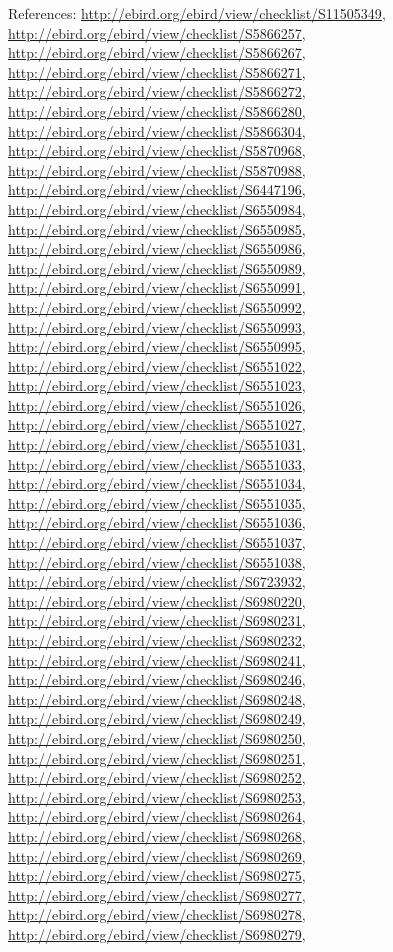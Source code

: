 \documentclass[9pt, article]{memoir}
\begin{document}
\begin{multicols}{2}
References: 
\url{http://ebird.org/ebird/view/checklist/S11505349}, 
\url{http://ebird.org/ebird/view/checklist/S5866257}, 
\url{http://ebird.org/ebird/view/checklist/S5866267}, 
\url{http://ebird.org/ebird/view/checklist/S5866271}, 
\url{http://ebird.org/ebird/view/checklist/S5866272}, 
\url{http://ebird.org/ebird/view/checklist/S5866280}, 
\url{http://ebird.org/ebird/view/checklist/S5866304}, 
\url{http://ebird.org/ebird/view/checklist/S5870968}, 
\url{http://ebird.org/ebird/view/checklist/S5870988}, 
\url{http://ebird.org/ebird/view/checklist/S6447196}, 
\url{http://ebird.org/ebird/view/checklist/S6550984}, 
\url{http://ebird.org/ebird/view/checklist/S6550985}, 
\url{http://ebird.org/ebird/view/checklist/S6550986}, 
\url{http://ebird.org/ebird/view/checklist/S6550989}, 
\url{http://ebird.org/ebird/view/checklist/S6550991}, 
\url{http://ebird.org/ebird/view/checklist/S6550992}, 
\url{http://ebird.org/ebird/view/checklist/S6550993}, 
\url{http://ebird.org/ebird/view/checklist/S6550995}, 
\url{http://ebird.org/ebird/view/checklist/S6551022}, 
\url{http://ebird.org/ebird/view/checklist/S6551023}, 
\url{http://ebird.org/ebird/view/checklist/S6551026}, 
\url{http://ebird.org/ebird/view/checklist/S6551027}, 
\url{http://ebird.org/ebird/view/checklist/S6551031}, 
\url{http://ebird.org/ebird/view/checklist/S6551033}, 
\url{http://ebird.org/ebird/view/checklist/S6551034}, 
\url{http://ebird.org/ebird/view/checklist/S6551035}, 
\url{http://ebird.org/ebird/view/checklist/S6551036}, 
\url{http://ebird.org/ebird/view/checklist/S6551037}, 
\url{http://ebird.org/ebird/view/checklist/S6551038}, 
\url{http://ebird.org/ebird/view/checklist/S6723932}, 
\url{http://ebird.org/ebird/view/checklist/S6980220}, 
\url{http://ebird.org/ebird/view/checklist/S6980231}, 
\url{http://ebird.org/ebird/view/checklist/S6980232}, 
\url{http://ebird.org/ebird/view/checklist/S6980241}, 
\url{http://ebird.org/ebird/view/checklist/S6980246}, 
\url{http://ebird.org/ebird/view/checklist/S6980248}, 
\url{http://ebird.org/ebird/view/checklist/S6980249}, 
\url{http://ebird.org/ebird/view/checklist/S6980250}, 
\url{http://ebird.org/ebird/view/checklist/S6980251}, 
\url{http://ebird.org/ebird/view/checklist/S6980252}, 
\url{http://ebird.org/ebird/view/checklist/S6980253}, 
\url{http://ebird.org/ebird/view/checklist/S6980264}, 
\url{http://ebird.org/ebird/view/checklist/S6980268}, 
\url{http://ebird.org/ebird/view/checklist/S6980269}, 
\url{http://ebird.org/ebird/view/checklist/S6980275}, 
\url{http://ebird.org/ebird/view/checklist/S6980277}, 
\url{http://ebird.org/ebird/view/checklist/S6980278}, 
\url{http://ebird.org/ebird/view/checklist/S6980279}, 

\end{multicols}
\end{document}

